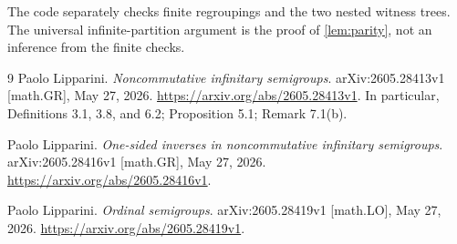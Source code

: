 \documentclass[11pt,letterpaper]{article}
\numberwithin{equation}{section}
\theoremstyle{definition}
\theoremstyle{remark}
\begin{document}
The code separately checks finite regroupings and the two nested witness trees. The universal infinite-partition argument is the proof of \cref{lem:parity}, not an inference from the finite checks.

\begin{thebibliography}{9}
Paolo Lipparini.
\emph{Noncommutative infinitary semigroups}.
arXiv:2605.28413v1 [math.GR], May 27, 2026.
\url{https://arxiv.org/abs/2605.28413v1}.
In particular, Definitions 3.1, 3.8, and 6.2; Proposition 5.1; Remark 7.1(b).

Paolo Lipparini.
\emph{One-sided inverses in noncommutative infinitary semigroups}.
arXiv:2605.28416v1 [math.GR], May 27, 2026.
\url{https://arxiv.org/abs/2605.28416v1}.

Paolo Lipparini.
\emph{Ordinal semigroups}.
arXiv:2605.28419v1 [math.LO], May 27, 2026.
\url{https://arxiv.org/abs/2605.28419v1}.
\end{thebibliography}
\end{document}
